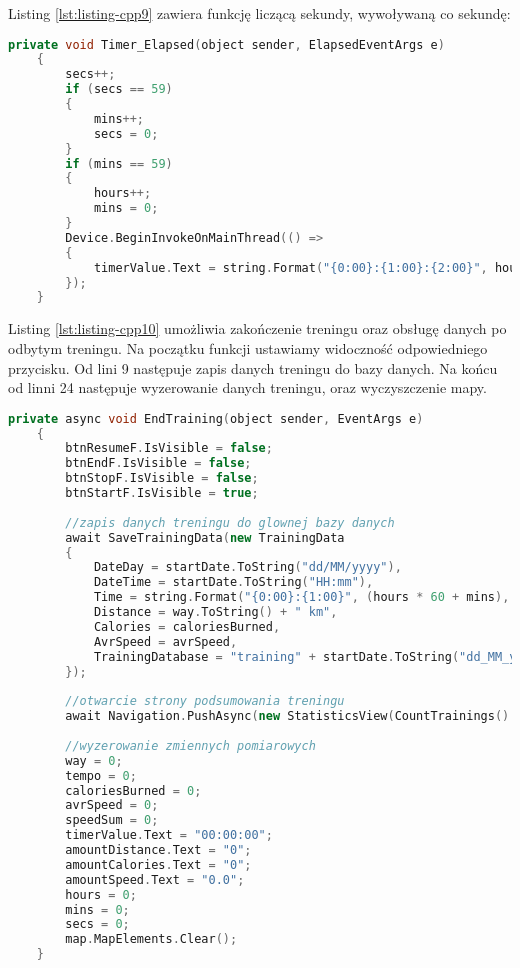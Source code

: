 Listing \ref{lst:listing-cpp9} zawiera funkcję liczącą sekundy, wywoływaną co sekundę:
\begin{lstlisting}[caption=Liczenie sekund (co sekundę:), label={lst:listing-cpp9}, language=C++]
	private void Timer_Elapsed(object sender, ElapsedEventArgs e)
	{
		secs++;
		if (secs == 59)
		{
			mins++;
			secs = 0;
		}
		if (mins == 59)
		{
			hours++;
			mins = 0;
		}
		Device.BeginInvokeOnMainThread(() =>
		{
			timerValue.Text = string.Format("{0:00}:{1:00}:{2:00}", hours, mins, secs);
		});
	}
\end{lstlisting}

Listing \ref{lst:listing-cpp10} umożliwia zakończenie treningu oraz obsługę danych po odbytym treningu. Na początku funkcji ustawiamy widoczność odpowiedniego przycisku. Od lini 9 następuje zapis danych treningu do bazy danych. Na końcu od linni 24 następuje wyzerowanie danych treningu, oraz wyczyszczenie mapy.
\begin{lstlisting}[caption=Zakończenie treningu\, zapis danych do bazy i ich podsumowanie, label={lst:listing-cpp10}, language=C++]
	private async void EndTraining(object sender, EventArgs e)
	{
		btnResumeF.IsVisible = false;
		btnEndF.IsVisible = false;
		btnStopF.IsVisible = false;
		btnStartF.IsVisible = true;
		
		//zapis danych treningu do glownej bazy danych
		await SaveTrainingData(new TrainingData
		{
			DateDay = startDate.ToString("dd/MM/yyyy"),
			DateTime = startDate.ToString("HH:mm"),
			Time = string.Format("{0:00}:{1:00}", (hours * 60 + mins), secs),
			Distance = way.ToString() + " km",
			Calories = caloriesBurned,
			AvrSpeed = avrSpeed, 
			TrainingDatabase = "training" + startDate.ToString("dd_MM_yyyy_HH_mm_ss") + ".db3"
		});
		
		//otwarcie strony podsumowania treningu
		await Navigation.PushAsync(new StatisticsView(CountTrainings().Result.ToString()));
		
		//wyzerowanie zmiennych pomiarowych
		way = 0;
		tempo = 0;
		caloriesBurned = 0;
		avrSpeed = 0;
		speedSum = 0;
		timerValue.Text = "00:00:00";
		amountDistance.Text = "0";
		amountCalories.Text = "0";
		amountSpeed.Text = "0.0";
		hours = 0;
		mins = 0;
		secs = 0;
		map.MapElements.Clear();
	}
\end{lstlisting}

